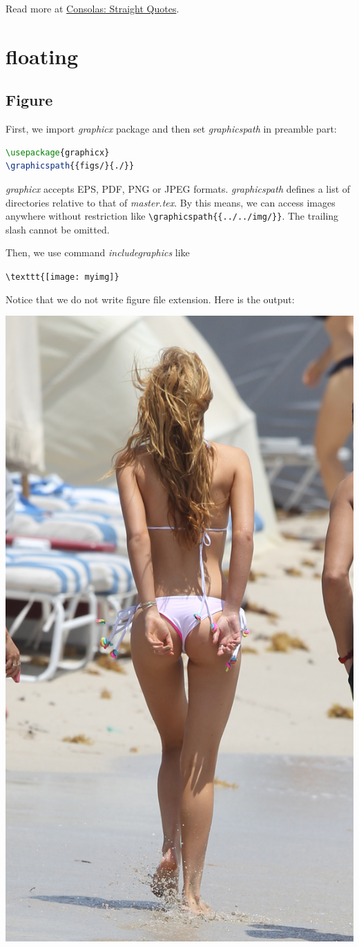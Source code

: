 Read more at
\href{https://tex.stackexchange.com/q/144396}{Consolas: Straight
  Quotes}.

\section{floating}
\label{sec:floating}

\subsection{Figure}
\label{sec:figure}

First, we import \textit{graphicx} package and then set
\textit{graphicspath} in preamble part:
\begin{lstlisting}[language=TeX,caption={graphicx}]
\usepackage{graphicx}
\graphicspath{{figs/}{./}}
\end{lstlisting}

\textit{graphicx} accepts EPS, PDF, PNG or JPEG
formats. \textit{graphicspath} defines a list of directories
relative to that of \textit{master.tex}. By this means, we can
access images anywhere without restriction like
\verb|\graphicspath{{../../img/}}|. The trailing slash cannot be
omitted.

Then, we use command \textit{includegraphics} like

\begin{center}
  \verb|\texttt{[image: myimg]}|
\end{center}

Notice that we do not write figure file extension. Here is the
output:
\begin{center}
  \includegraphics[width=.5\textwidth,scale=0.1]{leg}
\end{center}

